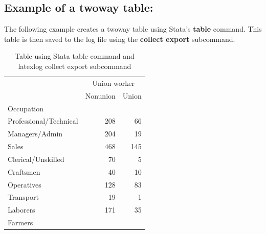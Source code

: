 \documentclass{article}
\begin{document}
\subsection{Example of a twoway table:}
The following example creates a twoway table using Stata's \textbf{table} command. 
This table is then saved to the log file using the \textbf{collect export} subcommand.
\begin{table}[htbp] 
\centering 
\begin{threeparttable} 
\caption{Table using Stata table command and latexlog collect export subcommand} 

\centering
\begin{tabular}{lll}
\toprule
\multicolumn{1}{c}{} &
  \multicolumn{2}{c}{Union worker} \\
\multicolumn{1}{c}{} &
  \multicolumn{1}{r}{Nonunion} &
  \multicolumn{1}{r}{Union} \\
\midrule
\multicolumn{1}{l}{Occupation} &
  \multicolumn{1}{r}{} &
  \multicolumn{1}{r}{} \\
\multicolumn{1}{l}{\hspace{1em}Professional/Technical} &
  \multicolumn{1}{r}{208} &
  \multicolumn{1}{r}{66} \\
\multicolumn{1}{l}{\hspace{1em}Managers/Admin} &
  \multicolumn{1}{r}{204} &
  \multicolumn{1}{r}{19} \\
\multicolumn{1}{l}{\hspace{1em}Sales} &
  \multicolumn{1}{r}{468} &
  \multicolumn{1}{r}{145} \\
\multicolumn{1}{l}{\hspace{1em}Clerical/Unskilled} &
  \multicolumn{1}{r}{70} &
  \multicolumn{1}{r}{5} \\
\multicolumn{1}{l}{\hspace{1em}Craftsmen} &
  \multicolumn{1}{r}{40} &
  \multicolumn{1}{r}{10} \\
\multicolumn{1}{l}{\hspace{1em}Operatives} &
  \multicolumn{1}{r}{128} &
  \multicolumn{1}{r}{83} \\
\multicolumn{1}{l}{\hspace{1em}Transport} &
  \multicolumn{1}{r}{19} &
  \multicolumn{1}{r}{1} \\
\multicolumn{1}{l}{\hspace{1em}Laborers} &
  \multicolumn{1}{r}{171} &
  \multicolumn{1}{r}{35} \\
\multicolumn{1}{l}{\hspace{1em}Farmers} &

\end{tabular}
\end{threeparttable}
\end{table}
\end{document}
